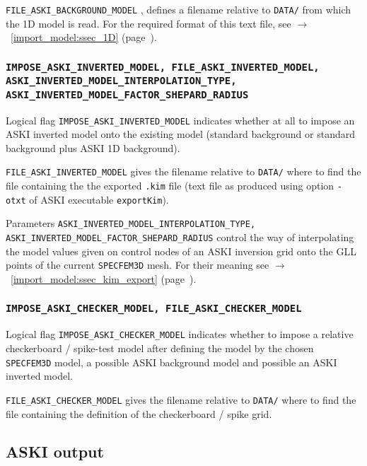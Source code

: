 \documentclass[12pt,a4paper]{article}
\newcommand{\lcode}[1]{\nolinkurl{#1}}
\newcommand{\lcodetitle}[1]{ {\ttfamily #1} }
\newcommand{\ASKI}{ {\ttfamily ASKI} }
\newcommand{\myaref}[1]{$\rightarrow$~\ref{#1} (page~\pageref{#1})}
\begin{document}
\lcode{FILE_ASKI_BACKGROUND_MODEL} , defines a filename relative to \lcode{DATA/} from which the 1D model
is read. For the required format of this text file, see \myaref{import_model:ssec_1D}.

\subsubsection*{\lcode{IMPOSE_ASKI_INVERTED_MODEL, FILE_ASKI_INVERTED_MODEL, ASKI_INVERTED_MODEL_INTERPOLATION_TYPE, 
ASKI_INVERTED_MODEL_FACTOR_SHEPARD_RADIUS}}
Logical flag \lcode{IMPOSE_ASKI_INVERTED_MODEL} indicates whether at all to impose an \ASKI inverted model
onto the existing model (standard background or standard background plus \ASKI 1D background).

\lcode{FILE_ASKI_INVERTED_MODEL} gives the filename relative to \lcode{DATA/} where to find the file containing
the the exported \lcode{.kim} file (text file as produced using option \lcode{-otxt} of \ASKI executable 
\lcode{exportKim}).

Parameters \lcode{ASKI_INVERTED_MODEL_INTERPOLATION_TYPE, ASKI_INVERTED_MODEL_FACTOR_SHEPARD_RADIUS} control the
way of interpolating the model values given on control nodes of an \ASKI inversion grid onto the GLL points of
the current \lcode{SPECFEM3D} mesh. For their meaning see \myaref{import_model:ssec_kim_export}.

\subsubsection*{\lcode{IMPOSE_ASKI_CHECKER_MODEL, FILE_ASKI_CHECKER_MODEL}}
Logical flag \lcode{IMPOSE_ASKI_CHECKER_MODEL} indicates whether to impose a relative checkerboard / 
spike-test model after defining the model by the chosen \lcode{SPECFEM3D} model, a possible 
\ASKI background model and possible an \ASKI inverted model.

\lcode{FILE_ASKI_CHECKER_MODEL} gives the filename relative to \lcode{DATA/} where to find the file containing
the definition of the checkerboard / spike grid.

\subsection{\lcodetitle{ASKI} output} \label{Par_file_ASKI,sub:output}
\end{document}
